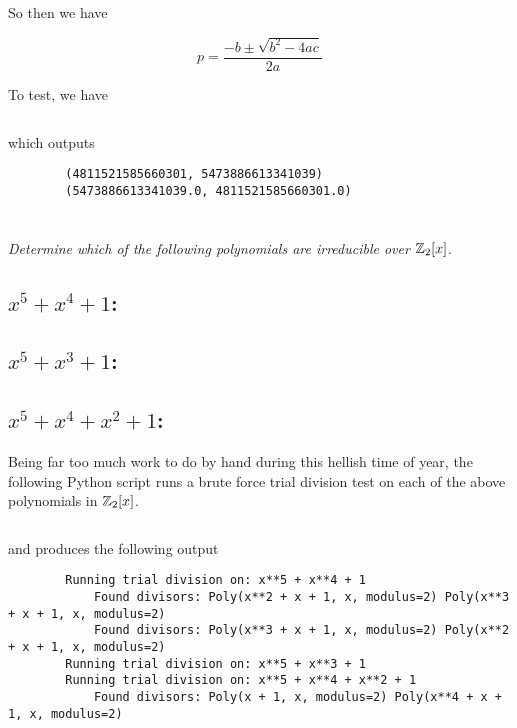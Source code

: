 \documentclass[12pt]{article}
\begin{document}
    So then we have

    $$p = \frac{-b \pm \sqrt{b^2 - 4ac}}{2a}$$

    To test, we have

    \inputminted{python}{scripts/prob_1.py}

    which outputs

    \begin{verbatim}
        (4811521585660301, 5473886613341039)
        (5473886613341039.0, 4811521585660301.0)
    \end{verbatim}

\newpage

\section{} \textit{Determine which of the following polynomials are irreducible over $\mathbb{Z}_2 [x]$.}

    \subsection{$x^5 + x^4 + 1$:}
    \subsection{$x^5 + x^3 + 1$:}
    \subsection{$x^5 + x^4 + x^2 + 1$:}

        Being far too much work to do by hand during this hellish time of year, the following Python script runs a brute force trial division test on each of the above polynomials in $\mathbb{Z}_2[x]$.

        \inputminted{python}{scripts/prob_2abc.py}

        and produces the following output

        \begin{verbatim}
        Running trial division on: x**5 + x**4 + 1
            Found divisors: Poly(x**2 + x + 1, x, modulus=2) Poly(x**3 + x + 1, x, modulus=2)
            Found divisors: Poly(x**3 + x + 1, x, modulus=2) Poly(x**2 + x + 1, x, modulus=2)
        Running trial division on: x**5 + x**3 + 1
        Running trial division on: x**5 + x**4 + x**2 + 1
            Found divisors: Poly(x + 1, x, modulus=2) Poly(x**4 + x + 1, x, modulus=2)
        \end{verbatim}
\end{document}
